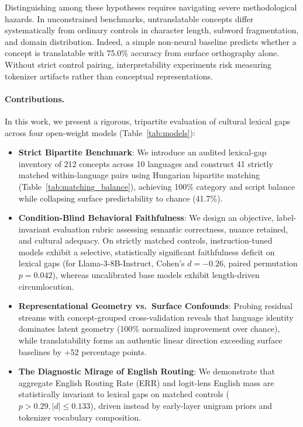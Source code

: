 \documentclass{article}
\begin{document}
Distinguishing among these hypotheses requires navigating severe methodological hazards. In unconstrained benchmarks, untranslatable concepts differ systematically from ordinary controls in character length, subword fragmentation, and domain distribution. Indeed, a simple non-neural baseline predicts whether a concept is translatable with 75.0\% accuracy from surface orthography alone. Without strict control pairing, interpretability experiments risk measuring tokenizer artifacts rather than conceptual representations.

\paragraph{Contributions.}
In this work, we present a rigorous, tripartite evaluation of cultural lexical gaps across four open-weight models (Table~\ref{tab:models}):
\begin{itemize}
    \item \textbf{Strict Bipartite Benchmark}: We introduce an audited lexical-gap inventory of 212 concepts across 10 languages and construct 41 strictly matched within-language pairs using Hungarian bipartite matching (Table~\ref{tab:matching_balance}), achieving 100\% category and script balance while collapsing surface predictability to chance (41.7\%).
    \item \textbf{Condition-Blind Behavioral Faithfulness}: We design an objective, label-invariant evaluation rubric assessing semantic correctness, nuance retained, and cultural adequacy. On strictly matched controls, instruction-tuned models exhibit a selective, statistically significant faithfulness deficit on lexical gaps (for Llama-3-8B-Instruct, Cohen's $d = -0.26$, paired permutation $p = 0.042$), whereas uncalibrated base models exhibit length-driven circumlocution.
    \item \textbf{Representational Geometry vs.\ Surface Confounds}: Probing residual streams with concept-grouped cross-validation reveals that language identity dominates latent geometry (100\% normalized improvement over chance), while translatability forms an authentic linear direction exceeding surface baselines by +52 percentage points.
    \item \textbf{The Diagnostic Mirage of English Routing}: We demonstrate that aggregate English Routing Rate (ERR) and logit-lens English mass are statistically invariant to lexical gaps on matched controls ($p > 0.29, |d| \le 0.133$), driven instead by early-layer unigram priors and tokenizer vocabulary composition.
\end{itemize}
\end{document}
